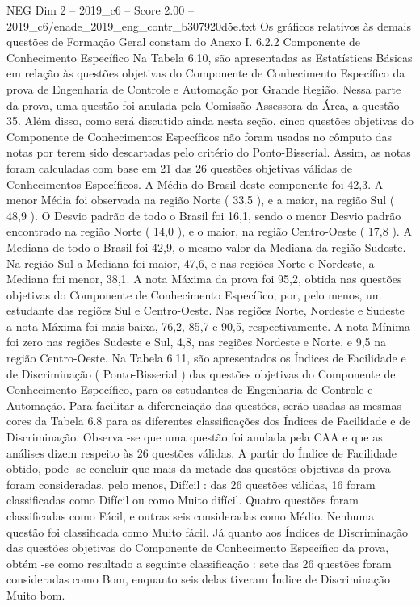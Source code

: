 \begin{textsample}{NEG Dim 2 – 2019\_c6 – Score 2.00 – 2019\_c6/enade\_2019\_eng\_contr\_b307920d5e.txt}
Os gráficos relativos às demais questões de Formação Geral constam do Anexo I. 6.2.2 Componente de Conhecimento Específico Na Tabela 6.10, são apresentadas as Estatísticas Básicas em relação às questões objetivas do Componente de Conhecimento Específico da prova de Engenharia de Controle e Automação por Grande Região.
Nessa parte da prova, uma questão foi anulada pela Comissão Assessora da Área, a questão 35.
Além disso, como será discutido ainda nesta seção, cinco questões objetivas do Componente de Conhecimentos Específicos não foram usadas no cômputo das notas por terem sido descartadas pelo critério do Ponto-Bisserial.
Assim, as notas foram calculadas com base em 21 das 26 questões objetivas válidas de Conhecimentos Específicos.
A Média do Brasil deste componente foi 42,3.
A menor Média foi observada na região Norte ( 33,5 ), e a maior, na região Sul ( 48,9 ).
O Desvio padrão de todo o Brasil foi 16,1, sendo o menor Desvio padrão encontrado na região Norte ( 14,0 ), e o maior, na região Centro-Oeste ( 17,8 ).
A Mediana de todo o Brasil foi 42,9, o mesmo valor da Mediana da região Sudeste.
Na região Sul a Mediana foi maior, 47,6, e nas regiões Norte e Nordeste, a Mediana foi menor, 38,1.
A nota Máxima da prova foi 95,2, obtida nas questões objetivas do Componente de Conhecimento Específico, por, pelo menos, um estudante das regiões Sul e Centro-Oeste.
Nas regiões Norte, Nordeste e Sudeste a nota Máxima foi mais baixa, 76,2, 85,7 e 90,5, respectivamente.
A nota Mínima foi zero nas regiões Sudeste e Sul, 4,8, nas regiões Nordeste e Norte, e 9,5 na região Centro-Oeste.
Na Tabela 6.11, são apresentados os Índices de Facilidade e de Discriminação ( Ponto-Bisserial ) das questões objetivas do Componente de Conhecimento Específico, para os estudantes de Engenharia de Controle e Automação.
Para facilitar a diferenciação das questões, serão usadas as mesmas cores da Tabela 6.8 para as diferentes classificações dos Índices de Facilidade e de Discriminação.
Observa -se que uma questão foi anulada pela CAA e que as análises dizem respeito às 26 questões válidas.
A partir do Índice de Facilidade obtido, pode -se concluir que mais da metade das questões objetivas da prova foram consideradas, pelo menos, Difícil : das 26 questões válidas, 16 foram classificadas como Difícil ou como Muito difícil.
Quatro questões foram classificadas como Fácil, e outras seis consideradas como Médio.
Nenhuma questão foi classificada como Muito fácil.
Já quanto aos Índices de Discriminação das questões objetivas do Componente de Conhecimento Específico da prova, obtém -se como resultado a seguinte classificação : sete das 26 questões foram consideradas como Bom, enquanto seis delas tiveram Índice de Discriminação Muito bom.

\end{textsample}
